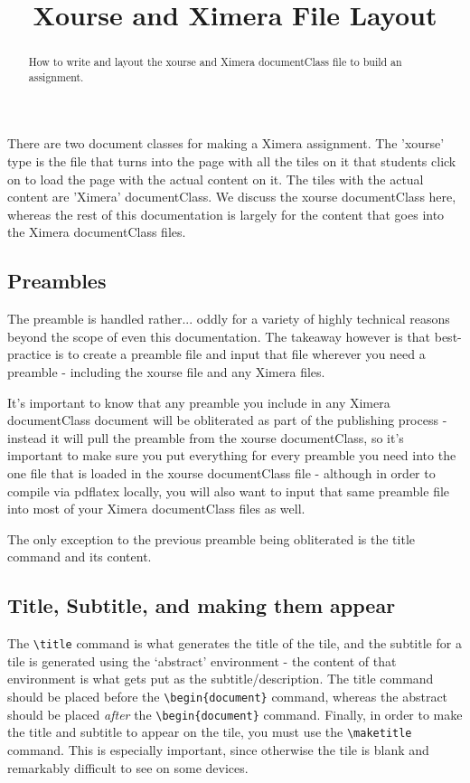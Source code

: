 \documentclass{ximera}
\title{Xourse and Ximera File Layout}
\begin{document}
\begin{abstract}
    How to write and layout the xourse and Ximera documentClass file to build an assignment.
\end{abstract}
\maketitle

There are two document classes for making a Ximera assignment. The 'xourse' type is the file that turns into the page with all the tiles on it that students click on to load the page with the actual content on it. The tiles with the actual content are 'Ximera' documentClass. We discuss the xourse documentClass here, whereas the rest of this documentation is largely for the content that goes into the Ximera documentClass files.

\subsection*{Preambles}
    The preamble is handled rather... oddly for a variety of highly technical reasons beyond the scope of even this documentation. The takeaway however is that best-practice is to create a preamble file and input that file wherever you need a preamble - including the xourse file and any Ximera files. 
    
    It's important to know that any preamble you include in any Ximera documentClass document will be obliterated as part of the publishing process - instead it will pull the preamble from the xourse documentClass, so it's important to make sure you put everything for every preamble you need into the one file that is loaded in the xourse documentClass file - although in order to compile via pdflatex locally, you will also want to input that same preamble file into most of your Ximera documentClass files as well.
    
    The only exception to the previous preamble being obliterated is the title command and its content.

\subsection*{Title, Subtitle, and making them appear}
    The \verb|\title| command is what generates the title of the tile, and the subtitle for a tile is generated using the `abstract' environment - the content of that environment is what gets put as the subtitle/description. The title command should be placed before the \verb|\begin{document}| command, whereas the abstract should be placed \textit{after} the \verb|\begin{document}| command. Finally, in order to make the title and subtitle to appear on the tile, you must use the \verb|\maketitle| command. This is especially important, since otherwise the tile is blank and remarkably difficult to see on some devices.
    
\end{document}
